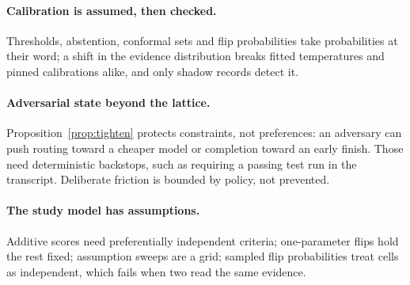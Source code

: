 \paragraph{Calibration is assumed, then checked.}
Thresholds, abstention, conformal sets and flip probabilities take
probabilities at their word; a shift in the evidence distribution breaks fitted
temperatures and pinned calibrations alike, and only shadow records detect
it.

\paragraph{Adversarial state beyond the lattice.}
Proposition~\ref{prop:tighten} protects constraints, not preferences: an
adversary can push routing toward a cheaper model or completion toward an early
finish. Those need deterministic backstops, such as requiring a passing test
run in the transcript. Deliberate friction is bounded by policy, not
prevented.

\paragraph{The study model has assumptions.}
Additive scores need preferentially independent criteria; one-parameter flips
hold the rest fixed; assumption sweeps are a grid; sampled flip probabilities
treat cells as independent, which fails when two read the same evidence.
